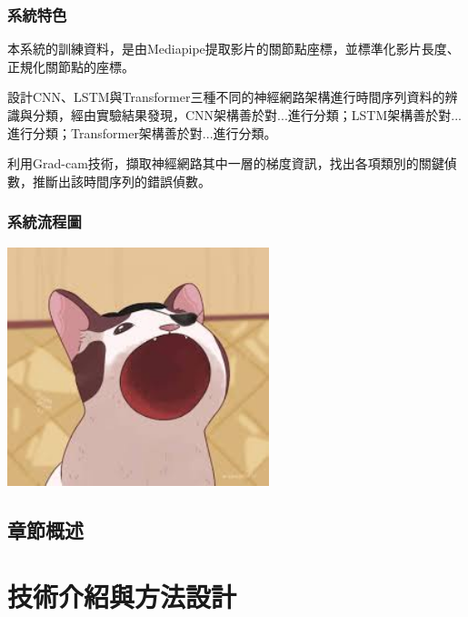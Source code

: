 \documentclass[12pt,a4paper]{report}
\begin{document}
\begin{CJK*}{UTF8}{bkai}
    \subsection{系統特色}
    \par
    本系統的訓練資料，是由Mediapipe提取影片的關節點座標，並標準化影片長度、正規化關節點的座標。

    \par
    設計CNN、LSTM與Transformer三種不同的神經網路架構進行時間序列資料的辨識與分類，經由實驗結果發現，CNN架構善於對...進行分類；LSTM架構善於對...進行分類；Transformer架構善於對...進行分類。
    \par
    利用Grad-cam技術，擷取神經網路其中一層的梯度資訊，找出各項類別的關鍵偵數，推斷出該時間序列的錯誤偵數。

    \subsection{系統流程圖}
    \includegraphics[width=3in]{demo.jpg}

    \section{章節概述}
    \par

    \chapter{技術介紹與方法設計}

\end{CJK*}
\end{document}
